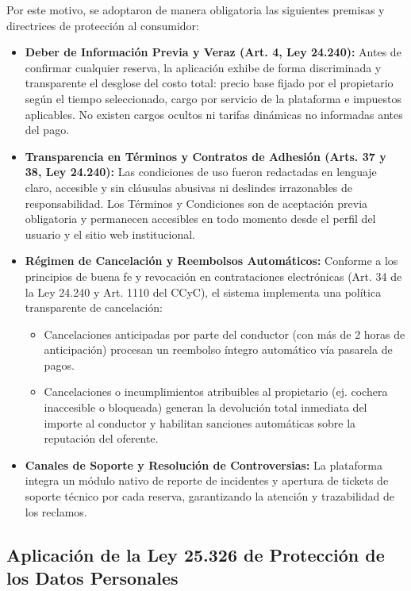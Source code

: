 Por este motivo, se adoptaron de manera obligatoria las siguientes premisas y directrices de protección al consumidor:

\begin{itemize}
    \item \textbf{Deber de Información Previa y Veraz (Art. 4, Ley 24.240):} Antes de confirmar cualquier reserva, la aplicación exhibe de forma discriminada y transparente el desglose del costo total: precio base fijado por el propietario según el tiempo seleccionado, cargo por servicio de la plataforma e impuestos aplicables. No existen cargos ocultos ni tarifas dinámicas no informadas antes del pago.
    \item \textbf{Transparencia en Términos y Contratos de Adhesión (Arts. 37 y 38, Ley 24.240):} Las condiciones de uso fueron redactadas en lenguaje claro, accesible y sin cláusulas abusivas ni deslindes irrazonables de responsabilidad. Los Términos y Condiciones son de aceptación previa obligatoria y permanecen accesibles en todo momento desde el perfil del usuario y el sitio web institucional.
    \item \textbf{Régimen de Cancelación y Reembolsos Automáticos:} Conforme a los principios de buena fe y revocación en contrataciones electrónicas (Art. 34 de la Ley 24.240 y Art. 1110 del CCyC), el sistema implementa una política transparente de cancelación:
    \begin{itemize}
        \item Cancelaciones anticipadas por parte del conductor (con más de 2 horas de anticipación) procesan un reembolso íntegro automático vía pasarela de pagos.
        \item Cancelaciones o incumplimientos atribuibles al propietario (ej. cochera inaccesible o bloqueada) generan la devolución total inmediata del importe al conductor y habilitan sanciones automáticas sobre la reputación del oferente.
    \end{itemize}
    \item \textbf{Canales de Soporte y Resolución de Controversias:} La plataforma integra un módulo nativo de reporte de incidentes y apertura de tickets de soporte técnico por cada reserva, garantizando la atención y trazabilidad de los reclamos.
\end{itemize}

\subsection{Aplicación de la Ley 25.326 de Protección de los Datos Personales}

